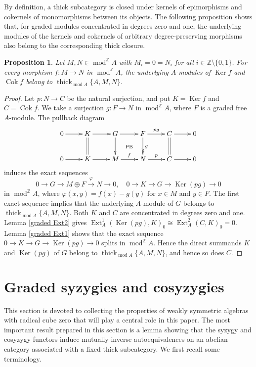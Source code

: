 \documentclass{amsart}
\newtheorem{prop}[thm]{Proposition}
\theoremstyle{definition}
\theoremstyle{remark}
\numberwithin{equation}{thm}
\def\cok{\operatorname{Cok}}
\def\Ext{\operatorname{Ext}}
\def\gmod{\operatorname{mod}^{\mathbb{Z}}\!}
\def\ker{\operatorname{Ker}}
\def\mod{\operatorname{mod}}
\def\thick{\operatorname{thick}}
\def\Z{\mathbb{Z}}
\begin{document}
By definition, a thick subcategory is closed under kernels of epimorphisms and cokernels of monomorphisms between its objects.
The following proposition shows that, for graded modules concentrated in degrees zero and one, the underlying modules of the kernels and cokernels of arbitrary degree-preserving morphisms also belong to the corresponding thick closure.

\begin{prop}\label{kernel cokernel}
Let $M,N\in\gmod A$ with $M_i=0=N_i$ for all $i\in\Z\setminus\{0,1\}$.
For every morphism $f:M\to N$ in $\gmod A$, the underlying $A$-modules of $\ker f$ and $\cok f$ belong to $\thick_{\mod A}\{A,M,N\}$.
\end{prop}

\begin{proof}
Let $p:N\to C$ be the natural surjection, and put $K=\ker f$ and $C=\cok f$. 
We take a surjection $g: F\to N$ in $\gmod A$, where $F$ is a graded free $A$-module.
The pullback diagram 
$$
\xymatrix{
0\ar[r]&K\ar[r]\ar@{=}[d]&
G\ar[r]\ar[d]\ar@{}[dr]|{\text{\scriptsize PB}}
&F\ar[r]^{pg}\ar@{->>}[d]^{g}&
C\ar[r]\ar@{=}[d]&0\\
0\ar[r]&K\ar[r]&
M\ar[r]^{f}&N\ar[r]^{p}&C\ar[r]&0 
}
$$
induces the exact sequences
$$
0\to G\to M\oplus F \xrightarrow{\varphi} N \to 0, \quad 0\to K\to G \to \ker(pg)\to 0
$$
in $\gmod A$, where $\varphi(x,y)=f(x)-g(y)$ for $x\in M$ and $y\in F$.
The first exact sequence implies that the underlying $A$-module of $G$ belongs to $\thick_{\mod A}\{A,M,N\}$.
Both $K$ and $C$ are concentrated in degrees zero and one. 
Lemma \ref{graded Ext2} gives $\Ext_A^1(\ker(pg),K)_0\cong\Ext_A^2(C,K)_0=0$. 
Lemma \ref{graded Ext1} shows that the exact sequence $0\to K\to G \to \ker(pg)\to 0$ splits in $\gmod A$.
Hence the direct summands $K$ and $\ker(pg)$ of $G$ belong to $\thick_{\mod A}\{A,M,N\}$, and hence so does $C$.
\end{proof}

\section{Graded syzygies and cosyzygies}

This section is devoted to collecting the properties of weakly symmetric algebras with radical cube zero that will play a central role in this paper.
The most important result prepared in this section is a lemma showing that the syzygy and cosyzygy functors induce mutually inverse autoequivalences on an abelian category associated with a fixed thick subcategory.
We first recall some terminology.
\end{document}
